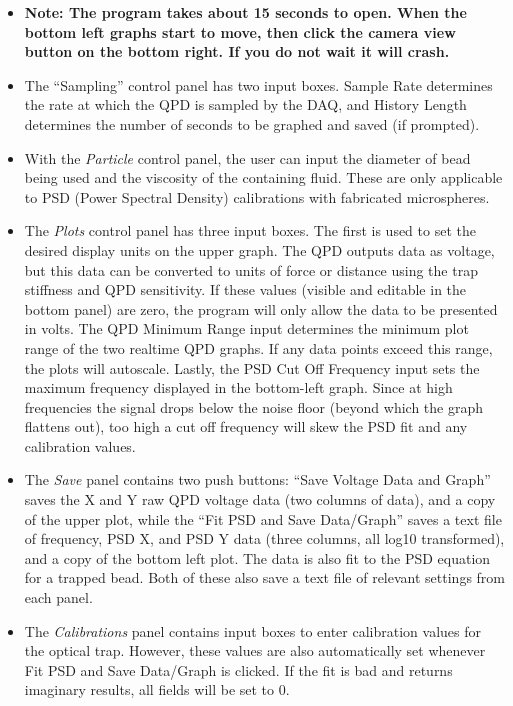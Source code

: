 \documentclass{../lab}
\begin{document}
\begin{itemize}
    \item \textbf{Note: The program takes about 15 seconds to open. When the bottom left graphs start to move, then click the camera view button on the bottom right. If you do not wait it will crash.}

    \item The ``Sampling'' control panel has two input boxes. Sample Rate determines the rate at which the QPD is sampled by the DAQ, and History Length determines the number of seconds to be graphed and saved (if prompted).

    \item With the \emph{Particle} control panel, the user can input the diameter of bead being used and the viscosity of the containing fluid. These are only applicable to PSD (Power Spectral Density) calibrations with fabricated microspheres.

    \item The \emph{Plots} control panel has three input boxes. The first is used to set the desired display units on the upper graph. The QPD outputs data as voltage, but this data can be converted to units of force or distance using the trap stiffness and QPD sensitivity. If these values (visible and editable in the bottom panel) are zero, the program will only allow the data to be presented in volts. The QPD Minimum Range input determines the minimum plot range of the two realtime QPD graphs. If any data points exceed this range, the plots will autoscale. Lastly, the PSD Cut Off Frequency input sets the maximum frequency displayed in the bottom-left graph. Since at high frequencies the signal drops below the noise floor (beyond which the graph flattens out), too high a cut off frequency will skew the PSD fit and any calibration values.

    \item The \emph{Save} panel contains two push buttons: ``Save Voltage Data and Graph'' saves the X and Y raw QPD voltage data (two columns of data), and a copy of the upper plot, while the ``Fit PSD and Save Data/Graph'' saves a text file of frequency, PSD X, and PSD Y data (three columns, all log10 transformed), and a copy of the bottom left plot. The data is also fit to the PSD equation for a trapped bead. Both of these also save a text file of relevant settings from each panel.

    \item The \emph{Calibrations} panel contains input boxes to enter calibration values for the optical trap. However, these values are also automatically set whenever Fit PSD and Save Data/Graph is clicked. If the fit is bad and returns imaginary results, all fields will be set to 0.


\end{itemize}
\end{document}
